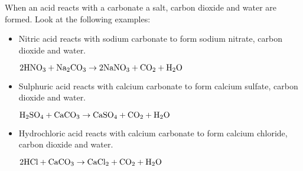 When an acid reacts with a carbonate a salt, carbon dioxide and water are formed. Look at the following examples:\\

\begin{itemize}
\item{Nitric acid reacts with sodium carbonate to form sodium nitrate, carbon dioxide and water.
\begin{center}
$\rm{2HNO_{3} + Na_{2}CO_{3} \rightarrow 2NaNO_{3} + CO_{2} + H_{2}O}$\\
\end{center}
}
\item{Sulphuric acid reacts with calcium carbonate to form calcium sulfate, carbon dioxide and water.
\begin{center}
$\rm{H_{2}SO_{4} + CaCO_{3} \rightarrow CaSO_{4} + CO_{2} + H_{2}O}$\\
\end{center}
}
\item{Hydrochloric acid reacts with calcium carbonate to form calcium chloride, carbon dioxide and water.
\begin{center}
$\rm{2HCl + CaCO_{3} \rightarrow CaCl_{2} + CO_{2} + H_{2}O}$
\end{center}
}
\end{itemize}
